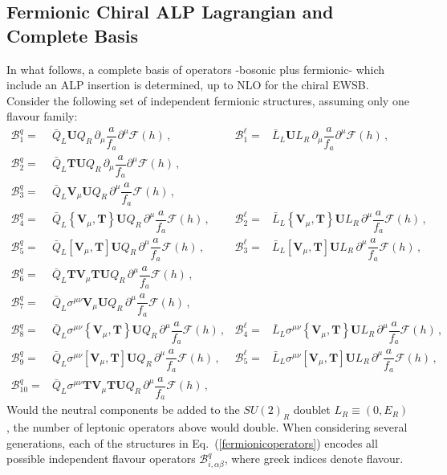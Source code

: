 \documentclass[11pt]{article}
\newcommand{\B}{\mathcal{B}}
\newcommand{\F}{\mathcal{F}}
\newcommand{\T}{\mathbf{T}}
\newcommand{\U}{\mathbf{U}}
\newcommand{\V}{\mathbf{V}}
\renewcommand{\[}{\begin{equation}}
\renewcommand{\]}{\end{equation}}
\begin{document}
\pagebreak 
\begin{appendices}

\section{Fermionic Chiral ALP Lagrangian and Complete Basis}
\label{App:FermionicCouplings}

In what follows, a complete basis of operators -bosonic plus fermionic- which include an ALP insertion is determined, up to NLO for the chiral EWSB.  
Consider the following set of independent fermionic structures, assuming only one flavour family:
\[
\begin{aligned}
\B^q_1=&\bar Q_L\U Q_R\,\partial_\mu\dfrac{a}{f_a}\partial^\mu\F(h)\,,
&\B^\ell_1=&\bar L_L\U L_R\,\partial_\mu\dfrac{a}{f_a}\partial^\mu\F(h)\,,\\
\B^q_2=&\bar Q_L\T\U Q_R\,\partial_\mu\dfrac{a}{f_a}\partial^\mu\F(h)\,,\\
\B^q_3=&\bar Q_L\V_\mu \U Q_R\,\partial^\mu\dfrac{a}{f_a}\F(h)\,,\\
\B^q_4=&\bar Q_L\left\{\V_\mu,\T\right\} \U Q_R\,\partial^\mu\dfrac{a}{f_a}\F(h)\,,
&\B^\ell_2=&\bar L_L\left\{\V_\mu,\T\right\} \U L_R\,\partial^\mu\dfrac{a}{f_a}\F(h)\,,\\
\B^q_5=&\bar Q_L\left[\V_\mu,\T\right] \U Q_R\,\partial^\mu\dfrac{a}{f_a}\F(h)\,,
&\B^\ell_3=&\bar L_L\left[\V_\mu,\T\right] \U L_R\,\partial^\mu\dfrac{a}{f_a}\F(h)\,,\\
\B^q_6=&\bar Q_L\T\V_\mu\T \U Q_R\,\partial^\mu\dfrac{a}{f_a}\F(h)\,,\\
\B^q_7=&\bar Q_L\sigma^{\mu\nu}\V_\mu\U Q_R\,\partial^\mu\dfrac{a}{f_a}\F(h)\,,\\
\B^q_8=&\bar Q_L\sigma^{\mu\nu}\left\{\V_\mu,\T\right\}\U Q_R\,\partial^\mu\dfrac{a}{f_a}\F(h)\,,
&\B^\ell_4=&\bar L_L\sigma^{\mu\nu}\left\{\V_\mu,\T\right\}\U L_R\,\partial^\mu\dfrac{a}{f_a}\F(h)\,,\\
\B^q_9=&\bar Q_L\sigma^{\mu\nu}\left[\V_\mu,\T\right]\U Q_R\,\partial^\mu\dfrac{a}{f_a}\F(h)\,,
&\B^\ell_5=&\bar L_L\sigma^{\mu\nu}\left[\V_\mu,\T\right]\U L_R\,\partial^\mu\dfrac{a}{f_a}\F(h)\,,\\
\B^q_{10}=&\bar Q_L\sigma^{\mu\nu}\T\V_\mu\T\U Q_R\,\partial^\mu\dfrac{a}{f_a}\F(h)\,,
\end{aligned} \label{fermionicoperators}
\]
Would the neutral components be added to  the $SU(2)_R$ doublet $L_R\equiv (0,E_R)$, the number of leptonic operators above would double. When considering several generations, each of the structures in Eq.~(\ref{fermionicoperators}) encodes all possible independent flavour operators $\B^q_{i,\alpha\beta}$, where greek indices denote flavour.


\end{appendices}
\end{document}
